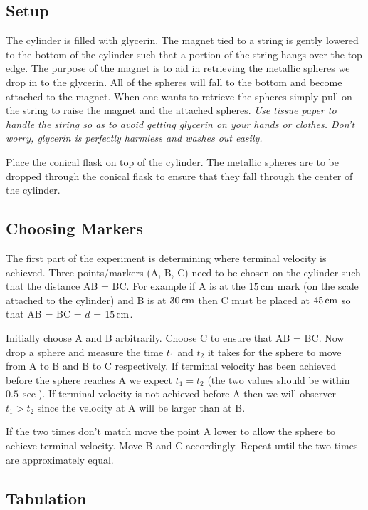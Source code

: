 \subsection*{Setup}

   The cylinder is filled with glycerin. The magnet tied to a string is gently lowered to the bottom of the cylinder such that a portion of the string hangs over the top edge. The purpose of the magnet is to aid in retrieving the metallic spheres we drop in to the glycerin. All of the spheres will fall to the bottom and become attached to the magnet. When one wants to retrieve the spheres simply pull on the string to raise the magnet and the attached spheres. \textit{Use tissue paper to handle the string so as to avoid getting glycerin on your hands or clothes. Don't worry, glycerin is perfectly harmless and washes out easily.}

   Place the conical flask on top of the cylinder. The metallic spheres are to be dropped through the conical flask to ensure that they fall through the center of the cylinder.

\subsection*{Choosing Markers}

   The first part of the experiment is determining where terminal velocity is achieved. Three points/markers (A, B, C) need to be chosen on the cylinder such that the distance AB = BC. For example if A is at the $15 \, \si{\centi \metre}$ mark (on the scale attached to the cylinder) and B is at $30 \, \si{\centi \metre}$ then C must be placed at $45 \, \si{\centi \metre}$ so that AB = BC = $d$ = $15 \, \si{\centi \metre}$.

   Initially choose A and B arbitrarily. Choose C to ensure that AB = BC. Now drop a sphere and measure the time $t_1$ and $t_2$ it takes for the sphere to move from A to B and B to C respectively. If terminal velocity has been achieved before the sphere reaches A we expect $t_1 = t_2$ (the two values should be within $0.5 \, \sec$). If terminal velocity is not achieved before A then we will observer $t_1 > t_2$ since the velocity at A will be larger than at B.

   If the two times don't match move the point A lower to allow the sphere to achieve terminal velocity. Move B and C accordingly. Repeat until the two times are approximately equal.

\subsection*{Tabulation}

